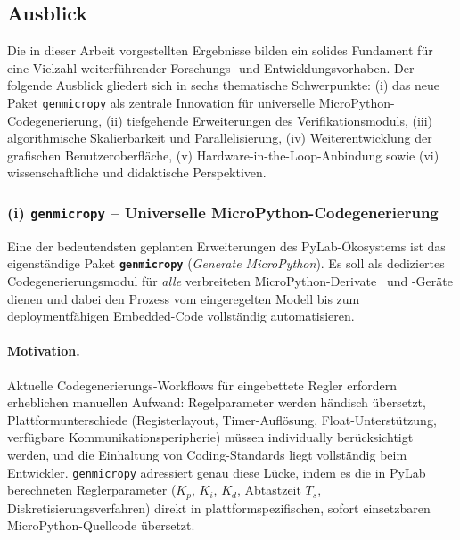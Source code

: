 \documentclass[a4paper,12pt]{article}
\theoremstyle{definition}
\begin{document}
\subsection{Ausblick}
\label{sec:ausblick}

Die in dieser Arbeit vorgestellten Ergebnisse bilden ein solides Fundament für
eine Vielzahl weiterführender Forschungs- und Entwicklungsvorhaben. Der folgende
Ausblick gliedert sich in sechs thematische Schwerpunkte: (i) das neue Paket
\texttt{genmicropy} als zentrale Innovation für universelle MicroPython-Codege\-nerierung,
(ii) tiefgehende Erweiterungen des Verifikationsmoduls, (iii) algorithmische
Skalierbarkeit und Parallelisierung, (iv) Weiterentwicklung der grafischen
Benutzeroberfläche, (v) Hardware-in-the-Loop-Anbindung sowie (vi) wissenschaftliche
und didaktische Perspektiven.

\subsubsection*{(i) \texttt{genmicropy} -- Universelle MicroPython-Codegenerierung}

Eine der bedeutendsten geplanten Erweiterungen des PyLab-Ökosystems ist das
eigenständige Paket \textbf{\texttt{genmicropy}} (\emph{Generate MicroPython}).
Es soll als dediziertes Codegenerierungsmodul für \emph{alle} verbreiteten
MicroPython-Derivate~\cite{micropython} und -Geräte dienen und dabei den Prozess vom eingeregelten
Modell bis zum deploymentfähigen Embedded-Code vollständig automatisieren.

\paragraph{Motivation.}
Aktuelle Codegenerierungs-Workflows für eingebettete Regler erfordern erheblichen
manuellen Aufwand: Regelparameter werden händisch übersetzt, Plattformunterschiede
(Register\-layout, Timer-Auflösung, Float-Unterstützung, verfügbare
Kommunikations\-peripherie) müssen individually berücksichtigt werden, und die
Einhaltung von Coding-Standards liegt vollständig beim Entwickler. \texttt{genmicropy}
adressiert genau diese Lücke, indem es die in PyLab berechneten Reglerparameter
($K_p$, $K_i$, $K_d$, Abtastzeit $T_s$, Diskretisierungsverfahren) direkt in
plattformspezifischen, sofort einsetzbaren MicroPython-Quellcode übersetzt.
\end{document}
